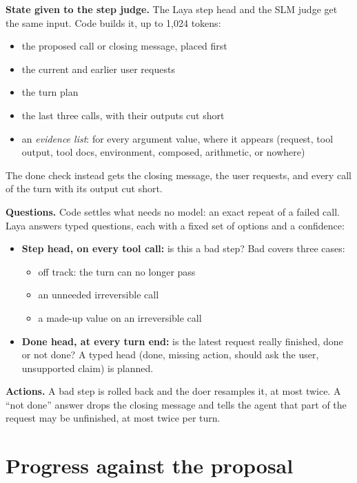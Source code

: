 \documentclass[10.5pt,a4paper]{article}
\begin{document}
\textbf{State given to the step judge.} The Laya step head and the SLM judge get the same input. Code builds it, up to 1,024 tokens:
\begin{itemize}
  \item the proposed call or closing message, placed first
  \item the current and earlier user requests
  \item the turn plan
  \item the last three calls, with their outputs cut short
  \item an \emph{evidence list}: for every argument value, where it appears (request, tool output, tool docs, environment, composed, arithmetic, or nowhere)
\end{itemize}
The done check instead gets the closing message, the user requests, and every call of the turn with its output cut short.

\textbf{Questions.} Code settles what needs no model: an exact repeat of a failed call. Laya answers typed questions, each with a fixed set of options and a confidence:
\begin{itemize}
  \item \textbf{Step head, on every tool call:} is this a bad step? Bad covers three cases:
  \begin{itemize}
    \item off track: the turn can no longer pass
    \item an unneeded irreversible call
    \item a made-up value on an irreversible call
  \end{itemize}
  \item \textbf{Done head, at every turn end:} is the latest request really finished, done or not done? A typed head (done, missing action, should ask the user, unsupported claim) is planned.
\end{itemize}

\textbf{Actions.} A bad step is rolled back and the doer resamples it, at most twice. A ``not done'' answer drops the closing message and tells the agent that part of the request may be unfinished, at most twice per turn.

\section{Progress against the proposal}\label{sec:progress}
\end{document}

